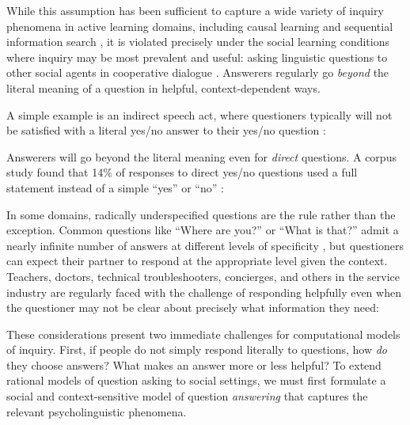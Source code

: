 \documentclass[12pt, floatsintext, jou]{apa6}
\begin{document}
While this assumption has been sufficient to capture a wide variety of inquiry phenomena in active learning domains, including causal learning \cite{bramley2015conservative} and sequential information search \cite{RuggeriLombrozo15_ChildrenAdaptQuestions}, it is violated precisely under the social learning conditions where inquiry may be most prevalent and useful: asking linguistic questions to other social agents in cooperative dialogue \cite{coenen2018asking}.
Answerers regularly go \emph{beyond} the literal meaning of a question in helpful, context-dependent ways.

A simple example is an indirect speech act, where questioners typically will not be satisfied with a literal yes/no answer to their yes/no question \cite{Clark79_IndirectSpeechActs}:  
 
Answerers will go beyond the literal meaning even for \emph{direct} questions. 
A corpus study found that 14\% of responses to direct yes/no questions used a full statement instead of a simple ``yes'' or ``no'' \cite{DeMarneffeGrimmPotts09_IndirectAnswersCorpus}:


In some domains, radically underspecified questions are the rule rather than the exception. 
Common questions like ``Where are you?'' or ``What is that?'' admit a nearly infinite number of answers at different levels of specificity \cite{Potts12_CardsDialogueCorpus}, but questioners can expect their partner to respond at the appropriate level given the context.
Teachers, doctors, technical troubleshooters, concierges, and others in the service industry are regularly faced with the challenge of responding helpfully even when the questioner may not be clear about precisely what information they need:


These considerations present two immediate challenges for computational models of inquiry. 
First, if people do not simply respond literally to questions, how \emph{do} they choose answers? 
What makes an answer more or less helpful?
To extend rational models of question asking to social settings, we must first formulate a social and context-sensitive model of question \emph{answering} that captures the relevant psycholinguistic phenomena.
\end{document}

